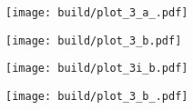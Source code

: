 \begin{figure}[H]
	\centering
	\texttt{[image: build/plot\_3\_a\_.pdf]}
	\caption{}
	\label{fig:3_a_}
\end{figure}

\begin{table}[H]
	\centering
	\caption{}
	\makebox[\linewidth][c]{}
	\label{tab:3_b}
\end{table}

\begin{figure}[H]
	\centering
	\texttt{[image: build/plot\_3\_b.pdf]}
	\caption{}
	\label{fig:3_b}
\end{figure}

\begin{figure}[H]
	\centering
	\texttt{[image: build/plot\_3i\_b.pdf]}
	\caption{}
	\label{fig:3i_b}
\end{figure}

\begin{figure}[H]
	\centering
	\texttt{[image: build/plot\_3\_b\_.pdf]}
	\caption{}
	\label{fig:3_b_}
\end{figure}
